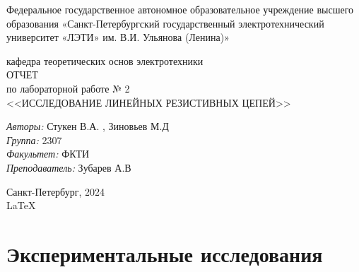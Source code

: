 \documentclass[a4paper,12pt]{report}
\begin{document}
 

\begin{titlepage} 

\begin{center} 

\large Федеральное государственное автономное образовательное учреждение высшего образования «Санкт-Петербургский государственный электротехнический университет «ЛЭТИ» им. В.И. Ульянова (Ленина)»
	
кафедра теоретических основ электротехники\\[5cm] 

\huge ОТЧЕТ\\ по лабораторной работе № 2\\[0.5cm] 
\large <<ИССЛЕДОВАНИЕ ЛИНЕЙНЫХ РЕЗИСТИВНЫХ ЦЕПЕЙ>>\\[3.7cm]

\begin{minipage}{1\textwidth} 
    \begin{flushleft} 
        \emph{Авторы:} Стукен В.А. , Зиновьев М.Д\\
        \emph{Группа:} 2307\\
        \emph{Факультет:} ФКТИ\\
        \emph{Преподаватель:} Зубарев А.В
    \end{flushleft} 
\end{minipage} 

\vfill 

Санкт-Петербург, 2024\\
{\large \LaTeX} 

\end{center} 

\thispagestyle{empty} 
\end{titlepage} 

\section*{Экспериментальные исследования}
\end{document}
